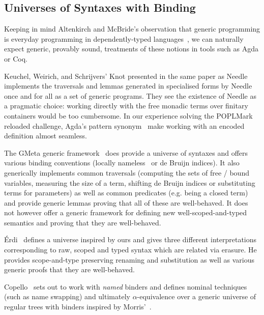 \subsection{Universes of Syntaxes with Binding} Keeping in mind Altenkirch
and McBride's observation that generic programming is everyday programming
in dependently-typed languages~\citeyear{genericprogramming-dtp}, we can naturally
expect generic, provably sound, treatments of these notions in tools such as
Agda or Coq.

Keuchel, Weirich, and Schrijvers' Knot presented in the same paper as
Needle~\citeyear{needleandknot} implements the traversals and lemmas generated
in specialised forms by Needle once and for all as a set of generic programs.
They see the existence of Needle as a pragmatic choice: working directly with
the free monadic terms over finitary containers would be too cumbersome. In
our experience solving the POPLMark reloaded challenge, Agda's pattern
synonym~\cite{Pickering:patsyn} make working with an encoded definition almost
seamless.

The GMeta generic framework~\citeyear{gmeta} does provide a universe of syntaxes
and offers various binding conventions (locally nameless~\cite{Charguéraud2012}
or de Bruijn indices). It also generically implements common traversals (computing
the sets of free / bound variables, measuring the size of a term, shifting
de Bruijn indices or substituting terms for parameters) as well as common
predicates (e.g. being a closed term) and provide generic lemmas proving that
all of these are well-behaved. It does not however offer a generic framework
for defining new well-scoped-and-typed semantics and proving that they are
well-behaved.

Érdi~\citeyear{gergodraft} defines a universe inspired by ours and gives three
different interpretations corresponding to raw, scoped and typed syntax
which are related via erasure. He provides scope-and-type preserving renaming
and substitution as well as various generic proofs that they are well-behaved.

Copello~\citeyear{copello2017} sets out to work with \emph{named} binders and
defines nominal techniques (such as name swapping) and ultimately $\alpha$-equivalence
over a generic universe of regular trees with binders inspired by Morris'~\citeyear{morris-regulartt}.




